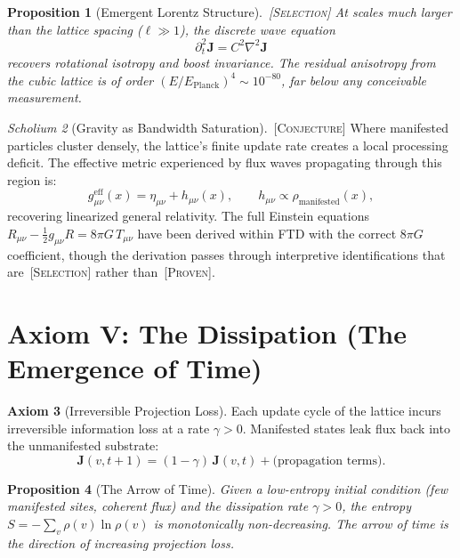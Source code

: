 \documentclass[11pt,twoside]{article}
\theoremstyle{definition}
\newtheorem{axiom}{Axiom}
\theoremstyle{plain}
\newtheorem{proposition}[axiom]{Proposition}
\theoremstyle{remark}
\newtheorem{scholium}[axiom]{Scholium}
\newcommand{\etag}[1]{\,\textnormal{\textsc{\footnotesize[#1]}}}
\newcommand{\proven}{\etag{Proven}}
\newcommand{\selection}{\etag{Selection}}
\newcommand{\conject}{\etag{Conjecture}}
\begin{document}
\begin{proposition}[Emergent Lorentz Structure]\label{prop:lorentz}\selection
At scales much larger than the lattice spacing ($\ell \gg 1$), the discrete wave equation
\begin{equation}
    \partial_t^2 \mathbf{J} = C^2 \nabla^2 \mathbf{J}
\end{equation}
recovers rotational isotropy and boost invariance. The residual anisotropy from the cubic lattice is of order $(E/E_{\text{Planck}})^4 \sim 10^{-80}$, far below any conceivable measurement.
\end{proposition}

\begin{scholium}[Gravity as Bandwidth Saturation]\label{sch:gravity}\conject
Where manifested particles cluster densely, the lattice's finite update rate creates a local processing deficit. The effective metric experienced by flux waves propagating through this region is:
\begin{equation}
    g_{\mu\nu}^{\text{eff}}(x) = \eta_{\mu\nu} + h_{\mu\nu}(x), \qquad h_{\mu\nu} \propto \rho_{\text{manifested}}(x),
\end{equation}
recovering linearized general relativity. The full Einstein equations $R_{\mu\nu} - \frac{1}{2}g_{\mu\nu}R = 8\pi G\, T_{\mu\nu}$ have been derived within FTD with the correct $8\pi G$ coefficient, though the derivation passes through interpretive identifications that are \selection{} rather than \proven{}.
\end{scholium}

\section{Axiom V: The Dissipation (The Emergence of Time)}

\begin{axiom}[Irreversible Projection Loss]\label{ax:dissipation}
Each update cycle of the lattice incurs irreversible information loss at a rate $\gamma > 0$. Manifested states leak flux back into the unmanifested substrate:
\begin{equation}
    \mathbf{J}(v, t+1) = (1 - \gamma)\,\mathbf{J}(v, t) + \text{(propagation terms)}.
\end{equation}
\end{axiom}

\begin{proposition}[The Arrow of Time]\label{prop:arrow}
Given a low-entropy initial condition (few manifested sites, coherent flux) and the dissipation rate $\gamma > 0$, the entropy $S = -\sum_v \rho(v) \ln \rho(v)$ is monotonically non-decreasing. The arrow of time is the direction of increasing projection loss.
\end{proposition}
\end{document}
